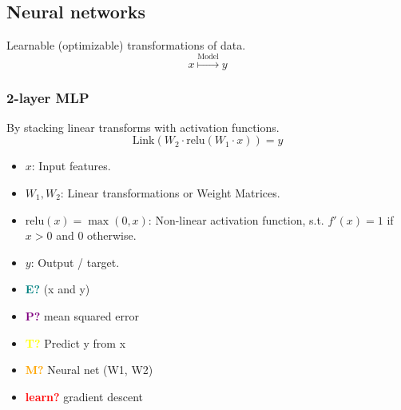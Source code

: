 \documentclass{article}
\begin{document}
\subsection{Neural networks}
\begin{definition}
    Learnable (optimizable) transformations of data.
    \begin{equation}
        x \overset{\text{Model}}{\mapsto} y
    \end{equation}
\end{definition}

\subsubsection{2-layer MLP}
\begin{definition} By stacking linear transforms with activation functions.
    \begin{equation}
        \text{Link}(W_2 \cdot \text{relu}(W_1 \cdot x)) = y
    \end{equation}
    \begin{itemize}
        \item $x$: Input features.
        \item $W_1, W_2$: Linear transformations or Weight Matrices.
        \item $\text{relu}(x) = \max(0,x)$: Non-linear activation function, s.t. $f'(x) = 1$ if $x > 0$ and $0$ otherwise.
        \item $y$: Output / target. 
    \end{itemize}
    \vspace{1em}

    \begin{itemize}
        \item \textcolor{teal}{\textbf{E?}} (x and y)
        \item \textcolor{purple}{\textbf{P?}} mean squared error
        \item \textcolor{yellow}{\textbf{T?}} Predict y from x
        \item \textcolor{orange}{\textbf{M?}} Neural net (W1, W2)
        \item \textcolor{red}{\textbf{learn?}} gradient descent
    \end{itemize}
\end{definition}
\end{document}
